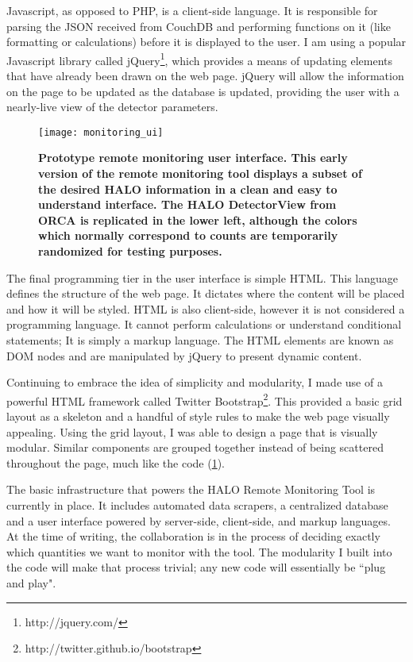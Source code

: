 			Javascript, as opposed to PHP, is a client-side language. It is responsible for parsing the JSON received from CouchDB and performing functions on it (like formatting or calculations) before it is displayed to the user. I am using a popular Javascript library called jQuery\footnote{http://jquery.com/}, which provides a means of updating elements that have already been drawn on the web page. jQuery will allow the information on the page to be updated as the database is updated, providing the user with a nearly-live view of the detector parameters. 

			\begin{figure}[H]
				\texttt{[image: monitoring\_ui]}
				\caption[Prototype Remote Monitoring User Interface]{\bf Prototype remote monitoring user interface. \rm This early version of the remote monitoring tool displays a subset of the desired HALO information in a clean and easy to understand interface. The HALO DetectorView from ORCA is replicated in the lower left, although the colors which normally correspond to counts are temporarily randomized for testing purposes.}
				\label{fig:mon_ui}
			\end{figure}

			The final programming tier in the user interface is simple HTML. This language defines the structure of the web page. It dictates where the content will be placed and how it will be styled. HTML is also client-side, however it is not considered a programming language. It cannot perform calculations or understand conditional statements; It is simply a markup language. The HTML elements are known as DOM nodes and are manipulated by jQuery to present dynamic content.

			Continuing to embrace the idea of simplicity and modularity, I made use of a powerful HTML framework called Twitter Bootstrap\footnote{http://twitter.github.io/bootstrap}. This provided a basic grid layout as a skeleton and a handful of style rules to make the web page visually appealing. Using the grid layout, I was able to design a page that is visually modular. Similar components are grouped together instead of being scattered throughout the page, much like the code (\FIG \ref{fig:mon_ui}). 

			The basic infrastructure that powers the HALO Remote Monitoring Tool is currently in place. It includes automated data scrapers, a centralized database and a user interface powered by server-side, client-side, and markup languages. At the time of writing, the collaboration is in the process of deciding exactly which quantities we want to monitor with the tool. The modularity I built into the code will make that process trivial; any new code will essentially be ``plug and play". 


